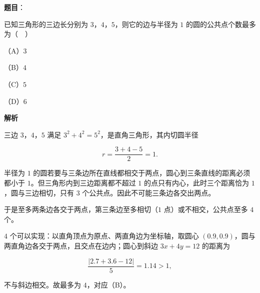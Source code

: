 \begin{answer}

\textbf{题目}：

已知三角形的三边长分别为 $3$，$4$，$5$，则它的边与半径为 $1$ 的圆的公共点个数最多为（　）

（A）$3$

（B）$4$

（C）$5$

（D）$6$

\textbf{解析}

三边 $3$，$4$，$5$ 满足 $3^2+4^2=5^2$，是直角三角形，其内切圆半径

\nopagebreak[4]
\[r=\frac{3+4-5}{2}=1.\]

半径为 $1$ 的圆若要与三条边所在直线都相交于两点，圆心到三条直线的距离必须都小于 $1$。但三角形内到三边距离都不超过 $1$ 的点只有内心，此时三个距离恰为 $1$，圆与三边相切，只有 $3$ 个公共点。因此不可能三条边各交出两点。

于是至多两条边各交于两点，第三条边至多相切（$1$ 点）或不相交，公共点至多 $4$ 个。

$4$ 个可以实现：以直角顶点为原点、两直角边为坐标轴，取圆心 $(0.9,0.9)$，圆与两直角边各交于两点，且交点在边内；圆心到斜边 $3x+4y=12$ 的距离为

\nopagebreak[4]
\[\frac{|2.7+3.6-12|}{5}=1.14>1,\]

不与斜边相交。故最多为 $4$，对应（B）。


\end{answer}
